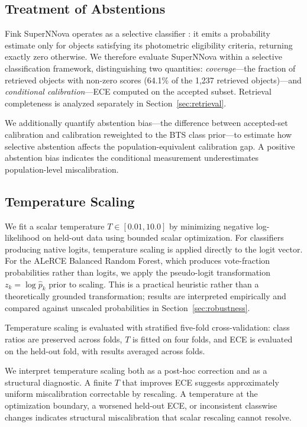 \documentclass[twocolumn]{aastex631}
\begin{document}
\subsection{Treatment of Abstentions}\label{sec:abstentions}

Fink SuperNNova operates as a selective classifier
\citep{geifman2017}: it emits a probability estimate only for
objects satisfying its photometric eligibility criteria, returning
exactly zero otherwise. We therefore evaluate SuperNNova within
a selective classification framework, distinguishing two
quantities: \textit{coverage}---the fraction of retrieved objects
with non-zero scores (64.1\% of the 1,237 retrieved
objects)---and \textit{conditional calibration}---ECE computed
on the accepted subset. Retrieval completeness is analyzed
separately in Section~\ref{sec:retrieval}.

We additionally quantify abstention bias---the difference between
accepted-set calibration and calibration reweighted to the BTS
class prior---to estimate how selective abstention affects the
population-equivalent calibration gap. A positive abstention bias
indicates the conditional measurement underestimates
population-level miscalibration.

\subsection{Temperature Scaling}\label{sec:tempscaling_methods}

We fit a scalar temperature $T \in [0.01, 10.0]$ by minimizing
negative log-likelihood on held-out data using bounded scalar
optimization. For classifiers producing native logits, temperature
scaling is applied directly to the logit vector. For the ALeRCE
Balanced Random Forest, which produces vote-fraction probabilities
rather than logits, we apply the pseudo-logit transformation
$z_k = \log \hat{p}_k$ prior to scaling. This is a practical
heuristic rather than a theoretically grounded transformation;
results are interpreted empirically and compared against unscaled
probabilities in Section~\ref{sec:robustness}.

Temperature scaling is evaluated with stratified five-fold
cross-validation: class ratios are preserved across folds, $T$
is fitted on four folds, and ECE is evaluated on the held-out
fold, with results averaged across folds.

We interpret temperature scaling both as a post-hoc correction
and as a structural diagnostic. A finite $T$ that improves ECE
suggests approximately uniform miscalibration correctable by
rescaling. A temperature at the optimization boundary, a worsened
held-out ECE, or inconsistent classwise changes indicates
structural miscalibration that scalar rescaling cannot resolve.
\end{document}
